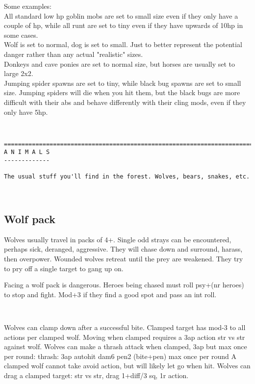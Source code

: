 Some examples:\\
All standard low hp goblin mobs are set to small size even if they only have a couple of hp, while all runt are set to tiny even if they have upwards of 10hp in some cases.\\
Wolf is set to normal, dog is set to small. Just to better represent the potential danger rather than any actual "realistic" sizes.\\
Donkeys and cave ponies are set to normal size, but horses are usually set to large 2x2.\\
Jumping spider spawns are set to tiny, while black bug spawns are set to small size. Jumping spiders will die when you hit them, but the black bugs are more difficult with their abs and behave differently with their cling mods, even if they only have 5hp.

\






\clearpage
{}


\goodbreak \begin{samepage} \small \begin{verbatim}
================================================================================
A N I M A L S
-------------

The usual stuff you'll find in the forest. Wolves, bears, snakes, etc.
\end{verbatim} \normalsize \end{samepage}

\

\subsection*{Wolf pack}
Wolves usually travel in packs of 4+. Single odd strays can be encountered, perhaps sick, deranged, aggressive. They will chase down and surround, harass, then overpower. Wounded wolves retreat until the prey are weakened. They try to pry off a single target to gang up on.

Facing a wolf pack is dangerous. Heroes being chased must roll psy+(nr heroes) to stop and fight. Mod+3 if they find a good spot and pass an int roll.

\

Wolves can clamp down after a successful bite.
Clamped target has mod-3 to all actions per clamped wolf.
Moving when clamped requires a 3ap action str vs str against wolf.
Wolves can make a thrash attack when clamped, 3ap but max once per round:
thrash: 3ap autohit dam6 pen2   (bite+pen)     max once per round
A clamped wolf cannot take avoid action, but will likely let go when hit.
Wolves can drag a clamped target: str vs str, drag 1+diff/3 sq, 1r action.

